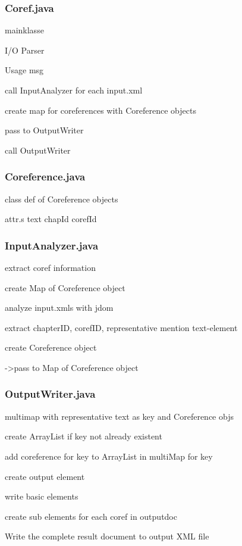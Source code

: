 \subsubsection{Coref.java}
mainklasse
  
  I/O Parser
  
  Usage msg
  
  call InputAnalyzer for each input.xml
  
  create map for coreferences with Coreference objects
  
  pass to OutputWriter
  
  call OutputWriter

\subsubsection{Coreference.java}
class def of Coreference objects
  
  attr.s text chapId corefId

\subsubsection{InputAnalyzer.java}
extract coref information
  
  create Map of Coreference object
  
    analyze input.xmls with jdom
    
    extract chapterID, corefID, representative mention text-element
    
    create Coreference object 
    
      ->pass to Map of Coreference object

\subsubsection{OutputWriter.java}
multimap with representative text as key and Coreference objs

  create ArrayList if key not already existent

  add coreference for key to ArrayList in multiMap for key

  create output element
  
    write basic elements
    
    create sub elements for each coref in outputdoc
  
Write the complete result document to output XML file
